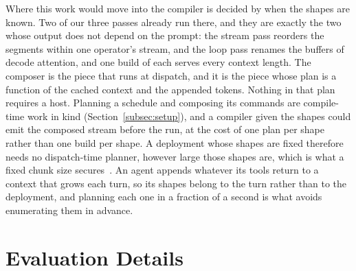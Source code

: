 Where this work would move into the compiler is decided by when the shapes are known.
Two of our three passes already run there, and they are exactly the two whose output does not depend on the prompt: the stream pass reorders the segments within one operator's stream, and the loop pass renames the buffers of decode attention, and one build of each serves every context length.
The composer is the piece that runs at dispatch, and it is the piece whose plan is a function of the cached context and the appended tokens.
Nothing in that plan requires a host.
Planning a schedule and composing its commands are compile-time work in kind (Section~\ref{subsec:setup}), and a compiler given the shapes could emit the composed stream before the run, at the cost of one plan per shape rather than one build per shape.
A deployment whose shapes are fixed therefore needs no dispatch-time planner, however large those shapes are, which is what a fixed chunk size secures~\citep{xu2025llmnpu}.
An agent appends whatever its tools return to a context that grows each turn, so its shapes belong to the turn rather than to the deployment, and planning each one in a fraction of a second is what avoids enumerating them in advance.

\section{Evaluation Details}
\label{app:eval-details}


